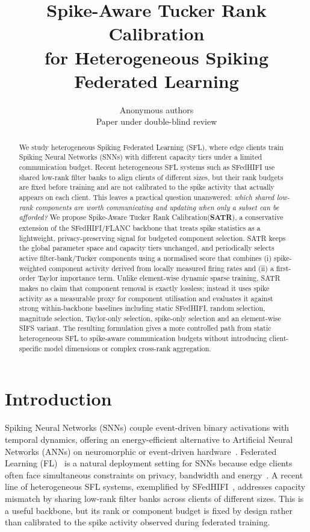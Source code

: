 \documentclass{article} %
\title{Spike-Aware Tucker Rank Calibration \\ for Heterogeneous Spiking Federated Learning}
\author{Anonymous authors\\
Paper under double-blind review}
\newcommand{\method}{SATR\xspace}
\newcommand{\methodbf}{\textbf{SATR}}
\newcommand{\methodfull}{Spike-Aware Tucker Rank Calibration\xspace}
\begin{document}
\maketitle

\begin{abstract}
We study heterogeneous Spiking Federated Learning (SFL), where edge clients train Spiking Neural Networks (SNNs) with different capacity tiers under a limited communication budget. Recent heterogeneous SFL systems such as SFedHIFI use shared low-rank filter banks to align clients of different sizes, but their rank budgets are fixed before training and are not calibrated to the spike activity that actually appears on each client. This leaves a practical question unanswered: \emph{which shared low-rank components are worth communicating and updating when only a subset can be afforded?} We propose \methodfull (\methodbf), a conservative extension of the SFedHIFI/FLANC backbone that treats spike statistics as a lightweight, privacy-preserving signal for budgeted component selection. \method keeps the global parameter space and capacity tiers unchanged, and periodically selects active filter-bank/Tucker components using a normalised score that combines (i) spike-weighted component activity derived from locally measured firing rates and (ii) a first-order Taylor importance term. Unlike element-wise dynamic sparse training, \method makes no claim that component removal is exactly lossless; instead it uses spike activity as a measurable proxy for component utilisation and evaluates it against strong within-backbone baselines including static SFedHIFI, random selection, magnitude selection, Taylor-only selection, spike-only selection and an element-wise SIFS variant. The resulting formulation gives a more controlled path from static heterogeneous SFL to spike-aware communication budgets without introducing client-specific model dimensions or complex cross-rank aggregation.
\end{abstract}

\section{Introduction}
\label{sec:intro}

Spiking Neural Networks (SNNs) couple event-driven binary activations with temporal dynamics, offering an energy-efficient alternative to Artificial Neural Networks (ANNs) on neuromorphic or event-driven hardware~\citep{roy2019nature, davies2018loihi}. Federated Learning (FL)~\citep{mcmahan2017fedavg} is a natural deployment setting for SNNs because edge clients often face simultaneous constraints on privacy, bandwidth and energy~\citep{venkatesha2021federated, skatchkovsky2020federated}. A recent line of heterogeneous SFL systems, exemplified by SFedHIFI~\citep{tao2026sfedhifi}, addresses capacity mismatch by sharing low-rank filter banks across clients of different sizes. This is a useful backbone, but its rank or component budget is fixed by design rather than calibrated to the spike activity observed during federated training.
\end{document}
